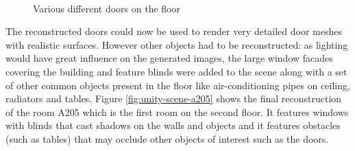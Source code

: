 \begin{figure}[htp]
{    }\\%
    \quad
    \caption{Various different doors on the floor}
    \label{fig:doors}
\end{figure}

The reconstructed doors could now be used to render very detailed door meshes with realistic surfaces. However other objects had to be reconstructed: as lighting would have great influence on the generated images, the large window facades covering the building and feature blinds were added to the scene along with a set of other common objects present in the floor like air-conditioning pipes on ceiling, radiators and tables. Figure \ref{fig:unity-scene-a205} shows the final reconstruction of the room A205 which is the first room on the second floor. It features windows with blinds that cast shadows on the walls and objects and it features obstacles (such as tables) that may occlude other objects of interest such as the doors.

